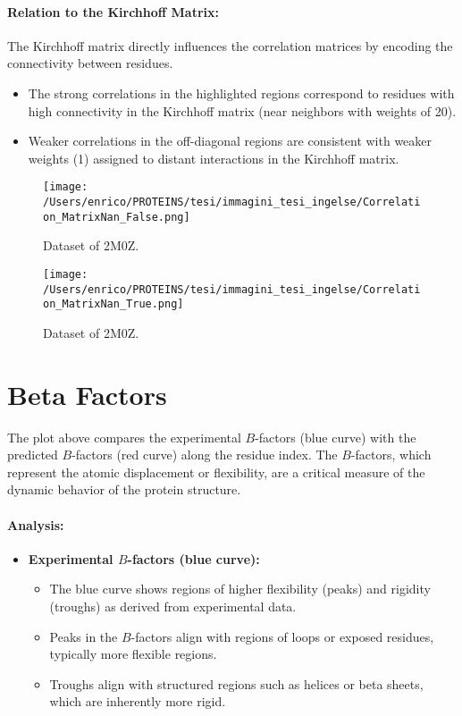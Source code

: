 \documentclass[English, Lau, oneside]{sapthesis}
\begin{document}
\begin{itemize}
\paragraph{Relation to the Kirchhoff Matrix:}

The Kirchhoff matrix directly influences the correlation matrices by encoding the connectivity between residues. 
\begin{itemize}
    \item The strong correlations in the highlighted regions correspond to residues with high connectivity in the Kirchhoff matrix (near neighbors with weights of 20).
    \item Weaker correlations in the off-diagonal regions are consistent with weaker weights (1) assigned to distant interactions in the Kirchhoff matrix.
\end{itemize}

\begin{figure}[h!]
    \centering
    \texttt{[image: /Users/enrico/PROTEINS/tesi/immagini\_tesi\_ingelse/Correlation\_MatrixNan\_False.png]}
    \caption{Dataset of 2M0Z.}
\end{figure}
\begin{figure}[h!]
    \centering
    \texttt{[image: /Users/enrico/PROTEINS/tesi/immagini\_tesi\_ingelse/Correlation\_MatrixNan\_True.png]}
    \caption{Dataset of 2M0Z.}
\end{figure}


\section*{Beta Factors}
The plot above compares the experimental \( B \)-factors (blue curve) with the predicted \( B \)-factors (red curve) along the residue index. The \( B \)-factors, which represent the atomic displacement or flexibility, are a critical measure of the dynamic behavior of the protein structure.

\paragraph{Analysis:}
\begin{itemize}
    \item \textbf{Experimental \( B \)-factors (blue curve):}
    \begin{itemize}
        \item The blue curve shows regions of higher flexibility (peaks) and rigidity (troughs) as derived from experimental data.
        \item Peaks in the \( B \)-factors align with regions of loops or exposed residues, typically more flexible regions.
        \item Troughs align with structured regions such as helices or beta sheets, which are inherently more rigid.
    \end{itemize}


\end{itemize}
\end{itemize}
\end{document}
